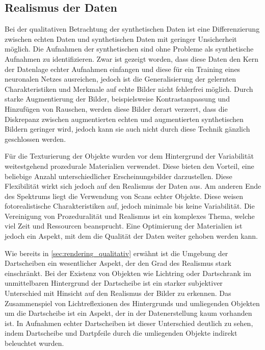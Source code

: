 
\subsection{Realismus der Daten}

Bei der qualitativen Betrachtung der synthetischen Daten ist eine Differenzierung zwischen echten Daten und synthetischen Daten mit geringer Unsicherheit möglich. Die Aufnahmen der synthetischen sind ohne Probleme als synthetische Aufnahmen zu identifizieren. Zwar ist gezeigt worden, dass diese Daten den Kern der Datenlage echter Aufnahmen einfangen und diese für ein Training eines neuronalen Netzes ausreichen, jedoch ist die Generalisierung der gelernten Charakteristiken und Merkmale auf echte Bilder nicht fehlerfrei möglich. Durch starke Augmentierung der Bilder, beispielsweise Kontrastanpassung und Hinzufügen von Rauschen, werden diese Bilder derart verzerrt, dass die Diskrepanz zwischen augmentierten echten und augmentierten synthetischen Bildern geringer wird, jedoch kann sie auch nicht durch diese Technik gänzlich geschlossen werden.

Für die Texturierung der Objekte wurden vor dem Hintergrund der Variabilität weitestgehend prozedurale Materialien verwendet. Diese bieten den Vorteil, eine beliebige Anzahl unterschiedlicher Erscheinungsbilder darzustellen. Diese Flexibilität wirkt sich jedoch auf den Realismus der Daten aus. Am anderen Ende des Spektrums liegt die Verwendung von Scans echter Objekte. Diese weisen fotorealistische Charakteristiken auf, jedoch minimale bis keine Variabilität. Die Vereinigung von Prozeduralität und Realismus ist ein komplexes Thema, welche viel Zeit und Ressourcen beansprucht. Eine Optimierung der Materialien ist jedoch ein Aspekt, mit dem die Qualität der Daten weiter gehoben werden kann.

Wie bereits in \autoref{sec:rendering_qualitativ} erwähnt ist die Umgebung der Dartscheiben ein wesentlicher Aspekt, der den Grad des Realismus stark einschränkt. Bei der Existenz von Objekten wie Lichtring oder Dartschrank im unmittelbaren Hintergrund der Dartscheibe ist ein starker subjektiver Unterschied mit Hinsicht auf den Realismus der Bilder zu erkennen. Das Zusammenspiel von Lichtreflexionen des Hintergrunds und umliegenden Objekten um die Dartscheibe ist ein Aspekt, der in der Datenerstellung kaum vorhanden ist. In Aufnahmen echter Dartscheiben ist dieser Unterschied deutlich zu sehen, indem Dartscheibe und Dartpfeile durch die umliegenden Objekte indirekt beleuchtet wurden.

